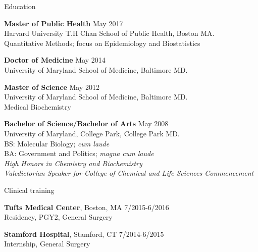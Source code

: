 \documentclass{resume} %
\begin{document}
\begin{rSection}{Education}

{\bf Master of Public Health} \hfill {May 2017}
\\ 
Harvard University T.H Chan School of Public Health, Boston MA. 
\\
Quantitative Methods; focus on Epidemiology and Biostatistics  

{\bf Doctor of Medicine} \hfill {May 2014}
\\ 
University of Maryland School of Medicine, Baltimore MD.

{\bf Master of Science} \hfill {May 2012}
\\ 
University of Maryland School of Medicine, Baltimore MD.
\\
Medical Biochemistry

{\bf Bachelor of Science/Bachelor of Arts} \hfill {May 2008}
\\ 
University of Maryland, College Park, College Park MD.
\\
BS: Molecular Biology; \textit{cum laude}\\
BA: Government and Politics; \textit{magna cum laude}\\
\textit{High Honors in Chemistry and Biochemistry}\\
\textit{Valedictorian Speaker for College of Chemical and Life Sciences Commencement}

\end{rSection}

\begin{rSection}{Clinical training}

{\bf Tufts Medical Center}{, Boston, MA} \hfill {7/2015-6/2016}
\\ 
Residency, PGY2, General Surgery

{\bf Stamford Hospital}{, Stamford, CT} \hfill {7/2014-6/2015}
\\ 
Internship, General Surgery
\end{rSection}

\end{document}

